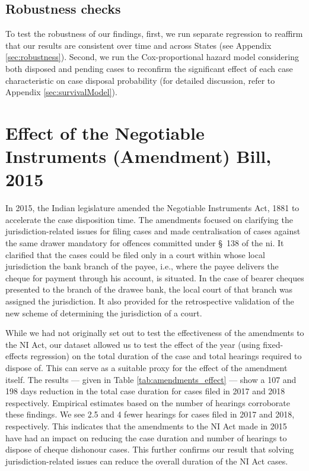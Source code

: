 \documentclass[12pt,a4paper]{article}
\begin{document}
\subsection*{Robustness checks}

To test the robustness of our findings, first, we run separate regression to reaffirm that our results are consistent over time and across States (see Appendix \ref{sec:robustness}). Second, we run the Cox-proportional hazard model considering both disposed and pending cases to reconfirm the significant effect of each case characteristic on case disposal probability (for detailed discussion, refer to Appendix \ref{sec:survivalModel}).

\section{Effect of the Negotiable Instruments (Amendment) Bill, 2015} \label{sec:2015amend}

In 2015, the Indian legislature amended the Negotiable Instruments Act, 1881 to accelerate the case disposition time. The amendments focused on clarifying the jurisdiction-related issues for filing cases and made centralisation of cases against the same drawer mandatory for offences committed under \S~138 of the \gls{ni}. It clarified that the cases could be filed only in a court within whose local jurisdiction the bank branch of the payee, i.e., where the payee delivers the cheque for payment through his account, is situated. In the case of bearer cheques presented to the branch of the drawee bank, the local court of that branch was assigned the jurisdiction. It also provided for the retrospective validation of the new scheme of determining the jurisdiction of a court.

While we had not originally set out to test the effectiveness of the amendments to the NI Act, our dataset allowed us to test the effect of the year (using fixed-effects regression) on the total duration of the case and total hearings required to dispose of. This can serve as a suitable proxy for the effect of the amendment itself. The results --- given in Table \ref{tab:amendments_effect} --- show a 107 and 198 days reduction in the total case duration for cases filed in 2017 and 2018 respectively. Empirical estimates based on the number of hearings corroborate these findings. We see 2.5 and 4 fewer hearings for cases filed in 2017 and 2018, respectively. This indicates that the amendments to the NI Act made in 2015 have had an impact on reducing the case duration and number of hearings to dispose of cheque dishonour cases. This further confirms our result that solving jurisdiction-related issues can reduce the overall duration of the NI Act cases.
\end{document}
